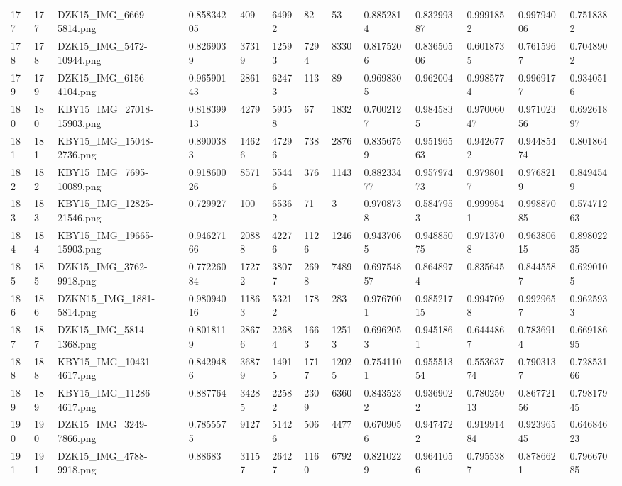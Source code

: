 \documentclass[11pt, a4paper, twoside]{report}
\begin{document}
\begin{longtable}[c]{@{}lllllllllllll@{}}
177 & 177 & DZK15\_IMG\_6669-5814.png & 0.85834205 & 409 & 64992 & 82 & 53 & 0.8852814 & 0.83299387 & 0.9991852 & 0.99794006 & 0.7518382 \\
178 & 178 & DZK15\_IMG\_5472-10944.png & 0.8269039 & 37319 & 12593 & 7294 & 8330 & 0.8175206 & 0.83650506 & 0.6018735 & 0.7615967 & 0.7048902 \\
179 & 179 & DZK15\_IMG\_6156-4104.png & 0.96590143 & 2861 & 62473 & 113 & 89 & 0.9698305 & 0.962004 & 0.9985774 & 0.9969177 & 0.9340516 \\
180 & 180 & KBY15\_IMG\_27018-15903.png & 0.81839913 & 4279 & 59358 & 67 & 1832 & 0.7002127 & 0.9845835 & 0.97006047 & 0.97102356 & 0.69261897 \\
181 & 181 & KBY15\_IMG\_15048-2736.png & 0.8900383 & 14626 & 47296 & 738 & 2876 & 0.8356759 & 0.95196563 & 0.9426772 & 0.94485474 & 0.801864 \\
182 & 182 & KBY15\_IMG\_7695-10089.png & 0.91860026 & 8571 & 55446 & 376 & 1143 & 0.88233477 & 0.95797473 & 0.9798017 & 0.9768219 & 0.8494549 \\
183 & 183 & KBY15\_IMG\_12825-21546.png & 0.729927 & 100 & 65362 & 71 & 3 & 0.9708738 & 0.5847953 & 0.9999541 & 0.99887085 & 0.57471263 \\
184 & 184 & KBY15\_IMG\_19665-15903.png & 0.94627166 & 20888 & 42276 & 1126 & 1246 & 0.9437065 & 0.94885075 & 0.9713708 & 0.96380615 & 0.89802235 \\
185 & 185 & DZK15\_IMG\_3762-9918.png & 0.77226084 & 17272 & 38077 & 2698 & 7489 & 0.69754857 & 0.8648974 & 0.835645 & 0.8445587 & 0.6290105 \\
186 & 186 & DZKN15\_IMG\_1881-5814.png & 0.98094016 & 11863 & 53212 & 178 & 283 & 0.9767001 & 0.98521715 & 0.9947098 & 0.9929657 & 0.9625933 \\
187 & 187 & DZK15\_IMG\_5814-1368.png & 0.8018119 & 28676 & 22684 & 1663 & 12513 & 0.6962053 & 0.9451861 & 0.6444867 & 0.7836914 & 0.66918695 \\
188 & 188 & KBY15\_IMG\_10431-4617.png & 0.8429486 & 36879 & 14915 & 1717 & 12025 & 0.7541101 & 0.95551354 & 0.55363774 & 0.7903137 & 0.72853166 \\
189 & 189 & KBY15\_IMG\_11286-4617.png & 0.887764 & 34285 & 22582 & 2309 & 6360 & 0.8435232 & 0.9369022 & 0.78025013 & 0.86772156 & 0.79817945 \\
190 & 190 & DZK15\_IMG\_3249-7866.png & 0.7855575 & 9127 & 51426 & 506 & 4477 & 0.6709056 & 0.9474722 & 0.91991484 & 0.92396545 & 0.64684623 \\
191 & 191 & DZK15\_IMG\_4788-9918.png & 0.88683 & 31157 & 26427 & 1160 & 6792 & 0.8210229 & 0.9641056 & 0.7955387 & 0.8786621 & 0.79667085 \\

\end{longtable}
\end{document}
